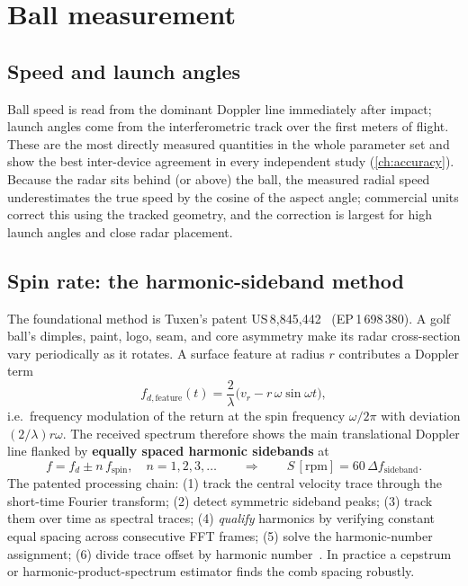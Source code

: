 \section{Ball measurement}

\subsection{Speed and launch angles}

Ball speed is read from the dominant Doppler line immediately after
impact; launch angles come from the interferometric track over the first
meters of flight. These are the most directly measured quantities in the
whole parameter set and show the best inter-device agreement in every
independent study (\cref{ch:accuracy}). Because the radar sits behind
(or above) the ball, the measured radial speed underestimates the true
speed by the cosine of the aspect angle; commercial units correct this
using the tracked geometry, and the correction is largest for high launch
angles and close radar placement.

\subsection{Spin rate: the harmonic-sideband method}
\label{sec:radarspin}

The foundational method is Tuxen's patent
US\,8,845,442~\cite{us8845442} (EP\,1\,698\,380). A golf ball's dimples,
paint, logo, seam, and core asymmetry make its radar cross-section vary
periodically as it rotates. A surface feature at radius $r$ contributes a
Doppler term
\begin{equation}
f_{d,\mathrm{feature}}(t) = \frac{2}{\lambda}
  \bigl(v_r - r\,\omega \sin\omega t\bigr),
\end{equation}
i.e.\ frequency modulation of the return at the spin frequency
$\omega/2\pi$ with deviation $(2/\lambda) r\omega$. The received spectrum
therefore shows the main translational Doppler line flanked by
\textbf{equally spaced harmonic sidebands} at
\begin{equation}
\label{eq:sidebands}
f = f_{d} \pm n\,f_{\mathrm{spin}}, \quad n = 1,2,3,\ldots
\qquad\Longrightarrow\qquad
S\,[\mathrm{rpm}] = 60\,\Delta f_{\mathrm{sideband}}.
\end{equation}
The patented processing chain: (1) track the central velocity trace
through the short-time Fourier transform; (2) detect symmetric sideband
peaks; (3) track them over time as spectral traces; (4) \emph{qualify}
harmonics by verifying constant equal spacing across consecutive FFT
frames; (5) solve the harmonic-number assignment; (6) divide trace offset
by harmonic number~\cite{us8845442,trackmanspinpatentblog}. In practice a
cepstrum or harmonic-product-spectrum estimator finds the comb spacing
robustly.


